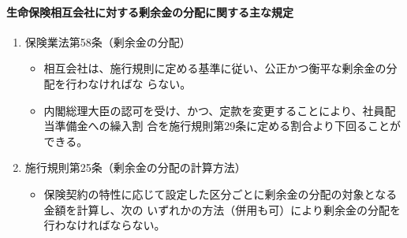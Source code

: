 \documentclass[report,gutter=10mm,fore-edge=10mm,uplatex,dvipdfmx]{jlreq}
\begin{document}
\paragraph{生命保険相互会社に対する剰余金の分配に関する主な規定}

\begin{enumerate} [＊]
\item 保険業法第58条（剰余金の分配）
\begin{itemize}
 \item 相互会社は、施行規則に定める基準に従い、公正かつ衡平な剰余金の分配を行わなければな
 らない。
\item 内閣総理大臣の認可を受け、かつ、定款を変更することにより、社員配当準備金への繰入割
 合を施行規則第29条に定める割合より下回ることができる。
\end{itemize}
\item 施行規則第25条（剰余金の分配の計算方法）
\begin{itemize}
 \item 保険契約の特性に応じて設定した区分ごとに剰余金の分配の対象となる金額を計算し、次の
 いずれかの方法（併用も可）により剰余金の分配を行わなければならない。


\end{itemize}
\end{enumerate}
\end{document}
